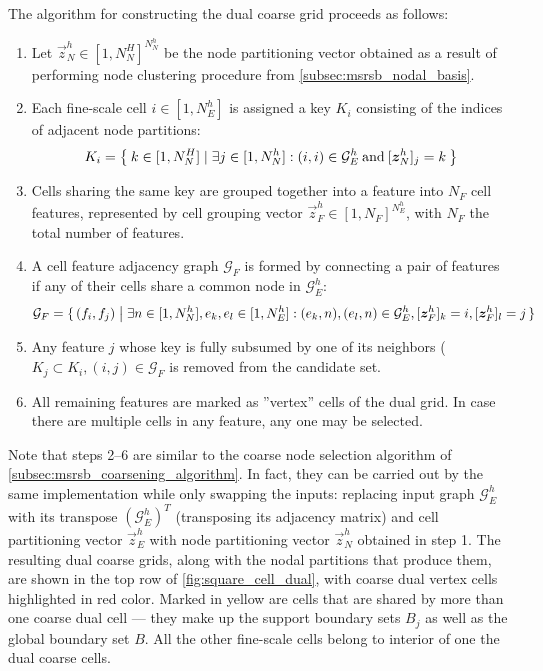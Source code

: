 The algorithm for constructing the dual coarse grid proceeds as follows:
\begin{enumerate}
    \item Let $\vec{z}_N^h \in [1,N_N^H]^{N_N^h}$ be the node partitioning vector obtained as a result of performing node clustering procedure from \autoref{subsec:msrsb_nodal_basis}.
    \item Each fine-scale cell $i \in [1,N_E^h]$ is assigned a key $K_i$ consisting of the indices of adjacent node partitions:
    \begin{align}
        K_i = \Set{ k \in [1,N_N^H] \mid \exists j \in [1,N_N^h]: (i,i) \in \mathcal{G}_E^h \:\text{and}\: [\bm{z}_N^h]_j = k }
    \end{align}
    \item Cells sharing the same key are grouped together into a feature into $N_F$ cell features, represented by cell grouping vector $\vec{z}_F^h \in [1,N_F]^{N_E^h}$, with $N_F$ the total number of features.
    \item A cell feature adjacency graph $\mathcal{G}_F$ is formed by connecting a pair of features if any of their cells share a common node in $\mathcal{G}_E^h$:
    \begin{align}
        \mathcal{G}_F = \set{(f_i,f_j) \bigm| \exists n \in [1,N_N^h], e_k, e_l \in [1,N_E^h]: (e_k,n), (e_l,n) \in \mathcal{G}_E^h, [\bm{z}_F^h]_k = i, [\bm{z}_F^h]_l = j}
    \end{align}
    \item Any feature $j$ whose key is fully subsumed by one of its neighbors ($K_j \subset K_i, (i,j) \in \mathcal{G}_F$ is removed from the candidate set.
    \item All remaining features are marked as ''vertex'' cells of the dual grid.   In case there are multiple cells in any feature, any one may be selected.
\end{enumerate}
Note that steps 2--6 are similar to the coarse node selection algorithm of \autoref{subsec:msrsb_coarsening_algorithm}.   In fact, they can be carried out by the same implementation while only swapping the inputs: replacing input graph $\mathcal{G}_{E}^h$ with its transpose $(\mathcal{G}_{E}^h)^T$ (transposing its adjacency matrix) and cell partitioning vector $\vec{z}_E^h$ with node partitioning vector $\vec{z}_N^h$ obtained in step 1.   The resulting dual coarse grids, along with the nodal partitions that produce them, are shown in the top row of \autoref{fig:square_cell_dual}, with coarse dual vertex cells highlighted in red color.   Marked in yellow are cells that are shared by more than one coarse dual cell --- they make up the support boundary sets $B_j$ as well as the global boundary set $B$.   All the other fine-scale cells belong to interior of one the dual coarse cells.

